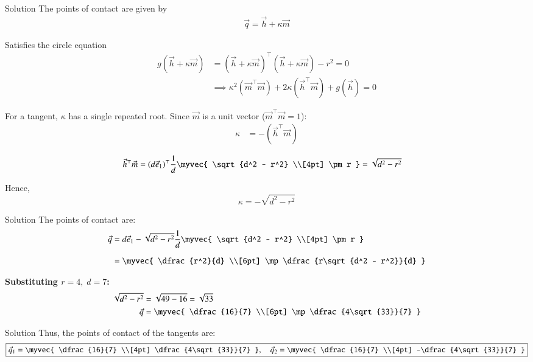 \documentclass{beamer}
\begin{document}
\begin{frame}{Solution}
The points of contact are given by 
\begin{align}
\vec{q} = \vec{h} + \kappa \vec{m}
\end{align}

Satisfies the circle equation
\begin{align}
g(\vec{h} + \kappa\vec{m}) 
&= (\vec{h} + \kappa\vec{m})^\top (\vec{h} + \kappa\vec{m}) - r^2 = 0 \\
&\implies 
\kappa^2 (\vec{m}^\top \vec{m}) + 2\kappa(\vec{h}^\top \vec{m}) + g(\vec{h}) = 0
\end{align}

For a tangent, \(\kappa\) has a single repeated root.
Since \(\vec{m}\) is a unit vector (\(\vec{m}^\top \vec{m} = 1\)):
\begin{align}
\kappa &= -(\vec{h}^\top \vec{m}) \label{eq:kappa_def}
\end{align}

\begin{align}
\vec{h}^\top \vec{m} 
&= (d\vec{e}_1)^\top 
\frac{1}{d}
\myvec{
\sqrt{d^2 - r^2} \\[4pt]
\pm r
}
= \sqrt{d^2 - r^2} 
\end{align}

Hence,
\[
\kappa = -\sqrt{d^2 - r^2}
\]
\end{frame}
\begin{frame}{Solution}
The points of contact are:
\begin{align}
\vec{q} 
&= d\vec{e}_1 - \sqrt{d^2 - r^2}
\frac{1}{d}
\myvec{
\sqrt{d^2 - r^2} \\[4pt]
\pm r
}
\\[6pt]
&=
\myvec{
\dfrac{r^2}{d} \\[6pt]
\mp \dfrac{r\sqrt{d^2 - r^2}}{d}
}
\label{eq:points}
\end{align}

\textbf{Substituting \(r = 4, \; d = 7\):}
\begin{align}
\sqrt{d^2 - r^2} &= \sqrt{49 - 16} = \sqrt{33} \\
\vec{q} 
&=
\myvec{
\dfrac{16}{7} \\[6pt]
\mp \dfrac{4\sqrt{33}}{7}
}
\end{align}
\end{frame}
\begin{frame}{Solution}
Thus, the points of contact of the tangents are:
\[
\boxed{
\vec{q}_1 = 
\myvec{
\dfrac{16}{7} \\[4pt]
\dfrac{4\sqrt{33}}{7}
}, 
\quad
\vec{q}_2 =
\myvec{
\dfrac{16}{7} \\[4pt]
-\dfrac{4\sqrt{33}}{7}
}
}
\]
\end{frame}
\end{document}

